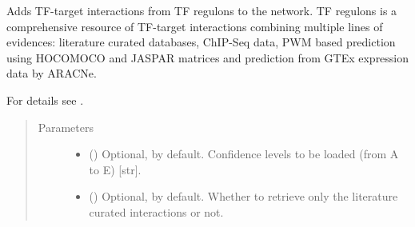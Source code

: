 \documentclass[letterpaper,10pt,english]{sphinxmanual}
\begin{document}
\begin{fulllineitems}
\begin{fulllineitems}
\begin{quote}
\begin{description}
\begin{itemize}
\end{itemize}

\end{description}\end{quote}

\end{fulllineitems}


\begin{fulllineitems}
\label{\detokenize{main:pypath.main.PyPath.load_signor_ptms}}
\end{fulllineitems}


\begin{fulllineitems}
\label{\detokenize{main:pypath.main.PyPath.load_tfregulons}}
Adds TF-target interactions from TF regulons to the network.
TF regulons is a comprehensive resource of TF-target
interactions combining multiple lines of evidences: literature
curated databases, ChIP-Seq data, PWM based prediction using
HOCOMOCO and JASPAR matrices and prediction from GTEx expression
data by ARACNe.

For details see .
\begin{quote}\begin{description}
\item[{Parameters}] \leavevmode\begin{itemize}
\item {} 
 () \textendash{} Optional,  by default. Confidence levels to be
loaded (from A to E) {[}str{]}.

\item {} 
 () \textendash{} Optional,  by default. Whether to retrieve only the
literature curated interactions or not.

\end{itemize}


\end{description}
\end{quote}
\end{fulllineitems}
\end{fulllineitems}
\end{document}
